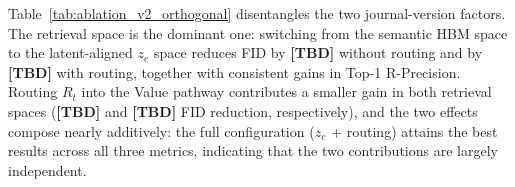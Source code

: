 \begin{table}[t]
    \centering
    \caption{Sensitivity of the query projector to the number of distillation targets (Top-$K$; $K$ here denotes the number of teacher candidates, not body parts) and to projector capacity, measured by text-to-motion recall on HumanML3D. Default settings are shaded.}
    \label{tab:ablation_v2_sensitivity}
    \renewcommand{\arraystretch}{1.3}  %
\end{table}

\noindent {}
Table~\ref{tab:ablation_v2_orthogonal} disentangles the two journal-version factors. The retrieval space is the dominant one: switching from the semantic HBM space to the latent-aligned $z_e$ space reduces FID by \textbf{[TBD]} without routing and by \textbf{[TBD]} with routing, together with consistent gains in Top-1 R-Precision. Routing $R_t$ into the Value pathway contributes a smaller gain in both retrieval spaces (\textbf{[TBD]} and \textbf{[TBD]} FID reduction, respectively), and the two effects compose nearly additively: the full configuration ($z_e$ + routing) attains the best results across all three metrics, indicating that the two contributions are largely independent.

